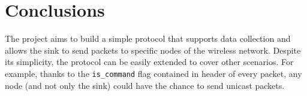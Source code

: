 \section{Conclusions}
\label{sec:conclusions}

The project aims to build a simple protocol that supports data collection and allows the sink to send packets to specific nodes of the wireless network.
Despite its simplicity, the protocol can be easily extended to cover other scenarios. For example, thanks to the \texttt{is\_command} flag contained in header of every packet, any node (and not only the sink) could have the chance to send unicast packets.